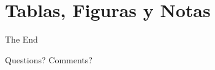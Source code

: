\documentclass[
11pt, %
]{beamer}
\begin{document}
\section{Tablas, Figuras y Notas}


\begin{frame}[plain] %
	\begin{center}
		{\Huge The End}

		\bigskip\bigskip %

		{\LARGE Questions? Comments?}
	\end{center}
\end{frame}

\end{document}
